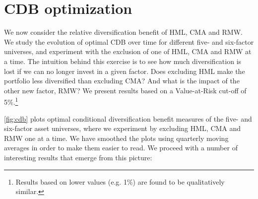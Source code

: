 
\section{CDB optimization} %
\label{sec:cdb_optimization}

We now consider the relative diversification benefit of HML, CMA and RMW. We study the evolution of optimal CDB over time for different five- and six-factor universes, and experiment with the exclusion of one of HML, CMA and RMW at a time. The intuition behind this exercise is to see how much diversification is lost if we can no longer invest in a given factor. Does excluding HML make the portfolio less diversified than excluding CMA? And what is the impact of the other new factor, RMW? We present results based on a Value-at-Risk cut-off of 5\%.\footnote{Results based on lower values (e.g. 1\%) are found to be qualitatively similar.} 

\autoref{fig:cdb} plots optimal conditional diversification benefit measures of the five- and six-factor asset universes, where we experiment by excluding HML, CMA and RMW one at a time. We have smoothed the plots using quarterly moving averages in order to make them easier to read. We proceed with a number of interesting results that emerge from this picture:

